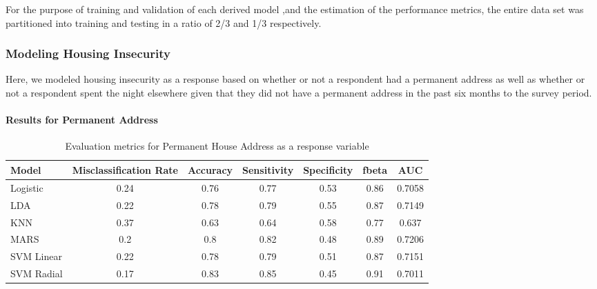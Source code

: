 \documentclass[
  10pt,
]{article}
\begin{document}
For the purpose of training and validation of each derived model ,and the estimation of the performance metrics, the entire data set was partitioned into training and testing in a ratio of 2/3 and 1/3 respectively.

\hypertarget{modeling-housing-insecurity}{%
\subsubsection{Modeling Housing Insecurity}\label{modeling-housing-insecurity}}

Here, we modeled housing insecurity as a response based on whether or not a respondent had a permanent address as well as whether or not a respondent spent the night elsewhere given that they did not have a permanent address in the past six months to the survey period.

\hypertarget{results-for-permanent-address}{%
\paragraph{Results for Permanent Address}\label{results-for-permanent-address}}

\begin{table}[H]

\caption{\label{tab:unnamed-chunk-9}Evaluation metrics for Permanent House Address  as a response variable}
\centering
\fontsize{12}{14}\selectfont
\begin{tabular}[t]{lcccccc}
\toprule
Model & Misclassification Rate & Accuracy & Sensitivity & Specificity & fbeta & AUC\\
\midrule
Logistic & 0.24 & 0.76 & 0.77 & 0.53 & 0.86 & 0.7058\\
LDA & 0.22 & 0.78 & 0.79 & 0.55 & 0.87 & 0.7149\\
KNN & 0.37 & 0.63 & 0.64 & 0.58 & 0.77 & 0.637\\
MARS & 0.2 & 0.8 & 0.82 & 0.48 & 0.89 & 0.7206\\
SVM Linear & 0.22 & 0.78 & 0.79 & 0.51 & 0.87 & 0.7151\\
SVM Radial & 0.17 & 0.83 & 0.85 & 0.45 & 0.91 & 0.7011\\
\bottomrule
\end{tabular}
\end{table}
\end{document}

